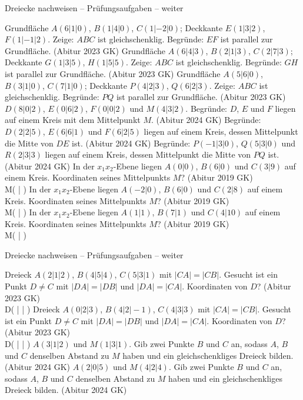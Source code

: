 \begin{aufgabe}{Dreiecke nachweisen – Prüfungsaufgaben – weiter}
\begin{teile}
\teil Grundfläche $A(6 | 1 | 0)$, $B(1 | 4 | 0)$, $C(1 | -2 | 0)$; Deckkante $E(1 | 3 | 2)$, $F(1 | -1 | 2)$. Zeige: $ABC$ ist gleichschenklig. Begründe: $EF$ ist parallel zur Grundfläche. \hfill (Abitur 2023 GK)
\teil Grundfläche $A(6 | 4 | 3)$, $B(2 | 1 | 3)$, $C(2 | 7 | 3)$; Deckkante $G(1 | 3 | 5)$, $H(1 | 5 | 5)$. Zeige: $ABC$ ist gleichschenklig. Begründe: $GH$ ist parallel zur Grundfläche. \hfill (Abitur 2023 GK)
\teil Grundfläche $A(5 | 6 | 0)$, $B(3 | 1 | 0)$, $C(7 | 1 | 0)$; Deckkante $P(4 | 2 | 3)$, $Q(6 | 2 | 3)$. Zeige: $ABC$ ist gleichschenklig. Begründe: $PQ$ ist parallel zur Grundfläche. \hfill (Abitur 2023 GK)
\teil $D(8 | 0 | 2)$, $E(0 | 6 | 2)$, $F(0 | 0 | 2)$ und $M(4 | 3 | 2)$. Begründe: $D$, $E$ und $F$ liegen auf einem Kreis mit dem Mittelpunkt $M$. \hfill (Abitur 2024 GK)
\teil Begründe: $D(2 | 2 | 5)$, $E(6 | 6 | 1)$ und $F(6 | 2 | 5)$ liegen auf einem Kreis, dessen Mittelpunkt die Mitte von $DE$ ist. \hfill (Abitur 2024 GK)
\teil Begründe: $P(-1 | 3 | 0)$, $Q(5 | 3 | 0)$ und $R(2 | 3 | 3)$ liegen auf einem Kreis, dessen Mittelpunkt die Mitte von $PQ$ ist. \hfill (Abitur 2024 GK)
\teil In der $x_1x_2$-Ebene liegen $A(0 | 0)$, $B(6 | 0)$ und $C(3 | 9)$ auf einem Kreis. Koordinaten seines Mittelpunkts $M$? \hfill (Abitur 2019 GK) \\ M( \leerfeld | \leerfeld )
\teil In der $x_1x_2$-Ebene liegen $A(-2 | 0)$, $B(6 | 0)$ und $C(2 | 8)$ auf einem Kreis. Koordinaten seines Mittelpunkts $M$? \hfill (Abitur 2019 GK) \\ M( \leerfeld | \leerfeld )
\teil In der $x_1x_2$-Ebene liegen $A(1 | 1)$, $B(7 | 1)$ und $C(4 | 10)$ auf einem Kreis. Koordinaten seines Mittelpunkts $M$? \hfill (Abitur 2019 GK) \\ M( \leerfeld | \leerfeld )
\end{teile}
\end{aufgabe}

\begin{aufgabe}{Dreiecke nachweisen – Prüfungsaufgaben – weiter}
\begin{teile}
\teil Dreieck $A(2 | 1 | 2)$, $B(4 | 5 | 4)$, $C(5 | 3 | 1)$ mit $|CA| = |CB|$. Gesucht ist ein Punkt $D \ne C$ mit $|DA| = |DB|$ und $|DA| = |CA|$. Koordinaten von $D$? \hfill (Abitur 2023 GK) \\ D( \leerfeld | \leerfeld | \leerfeld )
\teil Dreieck $A(0 | 2 | 3)$, $B(4 | 2 | -1)$, $C(4 | 3 | 3)$ mit $|CA| = |CB|$. Gesucht ist ein Punkt $D \ne C$ mit $|DA| = |DB|$ und $|DA| = |CA|$. Koordinaten von $D$? \hfill (Abitur 2023 GK) \\ D( \leerfeld | \leerfeld | \leerfeld )
\teil $A(3 | 1 | 2)$ und $M(1 | 3 | 1)$. Gib zwei Punkte $B$ und $C$ an, sodass $A$, $B$ und $C$ denselben Abstand zu $M$ haben und ein gleichschenkliges Dreieck bilden. \hfill (Abitur 2024 GK)
\teil $A(2 | 0 | 5)$ und $M(4 | 2 | 4)$. Gib zwei Punkte $B$ und $C$ an, sodass $A$, $B$ und $C$ denselben Abstand zu $M$ haben und ein gleichschenkliges Dreieck bilden. \hfill (Abitur 2024 GK)
\end{teile}
\end{aufgabe}

